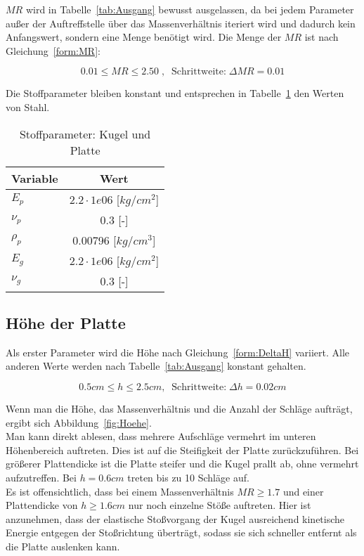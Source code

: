 $MR$ wird in Tabelle~\ref{tab:Ausgang} bewusst ausgelassen, da bei jedem Parameter außer der Auftreffstelle über das Massenverhältnis iteriert wird und dadurch kein Anfangswert, sondern eine Menge benötigt wird. Die Menge der $MR$ ist nach Gleichung~\ref{form:MR}:

\begin{equation}
	\label{form:MR}
	0.01 \leq MR \leq 2.50 \; , \;\; \mbox{Schrittweite:} \; \Delta MR = 0.01
\end{equation}

Die Stoffparameter bleiben konstant und entsprechen in Tabelle~\ref{tab:Stoff} den Werten von Stahl.

\begin{table}[H]
	\begin{center}
		\caption{Stoffparameter: Kugel und Platte}
		\label{tab:Stoff}
		\begin{tabular}{l|c}
			\textbf{Variable} & \textbf{Wert}\\
			\hline
			$E_{p}$ & $2.2 \cdot 1e06$ [$kg/cm^2$]\\
			$\nu_{p}$ & 0.3 [-]\\
			$\rho_{p}$ & 0.00796 [$kg/cm^{3}$]\\
			\hline
			$E_{g}$ &  $2.2 \cdot 1e06$ [$kg/cm^2$]\\
			$\nu_{g}$ & 0.3 [-]\\		
		\end{tabular}
	\end{center}
\end{table}

\subsection{Höhe der Platte}

Als erster Parameter wird die Höhe nach Gleichung~\ref{form:DeltaH} variiert. Alle anderen Werte werden nach Tabelle~\ref{tab:Ausgang} konstant gehalten.

\begin{equation}
	\label{form:DeltaH}
	0.5 cm \leq h \leq 2.5 cm, \; \; \mbox{Schrittweite:} \; \Delta h = 0.02 cm
\end{equation}

Wenn man die Höhe, das Massenverhältnis und die Anzahl der Schläge aufträgt, ergibt sich Abbildung~\ref{fig:Hoehe}.\\
Man kann direkt ablesen, dass mehrere Aufschläge vermehrt im unteren Höhenbereich auftreten. Dies ist auf die Steifigkeit der Platte zurückzuführen. Bei größerer Plattendicke ist die Platte steifer und die Kugel prallt ab, ohne vermehrt aufzutreffen. Bei $h = 0.6 cm$ treten bis zu 10 Schläge auf.\\
Es ist offensichtlich, dass bei einem Massenverhältnis $MR \geq 1.7$ und einer Plattendicke von $h \geq 1.6 cm$ nur noch einzelne Stöße auftreten. Hier ist anzunehmen, dass der elastische Stoßvorgang der Kugel ausreichend kinetische Energie entgegen der Stoßrichtung überträgt, sodass sie sich schneller entfernt als die Platte auslenken kann. \\

